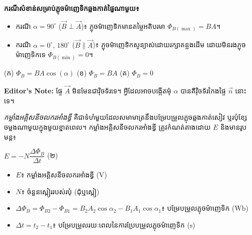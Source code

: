 \vspace{0.9em}
\noindent
\textbf{ករណីសំខាន់សម្រាប់ភ្លុចម៉ាញេទិកឆ្លងកាត់ផ្ទៃណាមួយ៖}

\begin{itemize}[itemsep=2pt, topsep=4pt, parsep=0pt, leftmargin=1.6em]
	\item ករណី $\alpha = 90^{\circ}$ ($\vec{B} \perp \vec{A}$)៖ ភ្លុចម៉ាញេទិកមានតម្លៃអតិបរមា $\Phi_{B(\max)} = BA$។
	\item ករណី $\alpha = 0^{\circ},\, 180^{\circ}$ ($\vec{B} \parallel \vec{A}$)៖ ភ្លុចម៉ាញេទិកសូន្យាស់ដោយរក្សាគន្លងដើម ដោយមិនរងភ្លុចម៉ាញេទិកទេ $\Phi_{B(\min)} = 0$។
\end{itemize}

\vspace{0.5em}

\begin{center}
	(ក) $\Phi_B = BA\cos(\alpha)$ \qquad\qquad
	(ខ) $\Phi_B = BA$ \qquad\qquad
	(គ) $\Phi_B = 0$
\end{center}

\begin{center}
	\textbf{Editor's Note:   }ផ្ទែ $\vec{A}$
	មិនមែនជាវុិចទ័រទេ។ អ្វីដែលអាចបង្កើតមុំ $\alpha$ បានគឺវុិចទ័រកៃងផ្ទៃ $\vec{n}$ នោះទេ។
\end{center}


\vspace{0.7em}
\noindent
\textit{កម្លាំងអគ្គិសនីចលករអាំងឌី្វ} គឺជាទំហំមួយដែលសមាមាត្រនឹងបម្រែបម្រួលភ្លុចឆ្លងកាត់សៀវ ឬរបុំខ្សែចម្លងណាមួយក្នុងមួយខ្នាតពេល។ កម្លាំងអគ្គិសនីចលករអាំងឌី្វ ត្រូវកំណត់តាងដោយ $E$ និងមានរូបមន្ត៖

\begin{center}
	$\boxed{E = -N\dfrac{\Delta\Phi_B}{\Delta t}}$ \quad (២)
\end{center}

\begin{itemize}[itemsep=2pt, topsep=4pt, parsep=0pt, leftmargin=1.6em]
	\item $E$៖ កម្លាំងអគ្គិសនីចលករអាំងឌី្វ ($\mathrm{V}$)
	\item $N$៖ ចំនួនស្ពៀររបស់របុំ (ជុំឬស្ពៀ)
	\item $\Delta\Phi_B = \Phi_{B2} - \Phi_{B1} = B_2A_2\cos\alpha_2 - B_1A_1\cos\alpha_1$៖ បម្រែបម្រួលភ្លុចម៉ាញេទិក ($\mathrm{Wb}$)
	\item $\Delta t = t_2 - t_1$៖ បម្រែបម្រួលរយៈពេលនៃការប្រែបម្រួលភ្លុចម៉ាញេទិក ($\mathrm{s}$)
\end{itemize}


